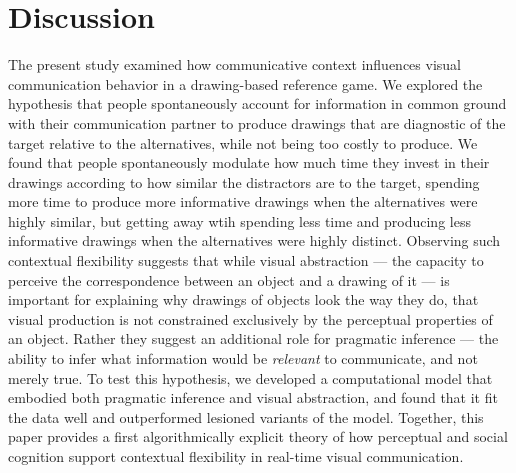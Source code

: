 \documentclass[9pt,twocolumn,twoside]{pnas-new}
\begin{document}
\section*{Discussion}

The present study examined how communicative context influences visual communication behavior in a drawing-based reference game. 
We explored the hypothesis that people spontaneously account for information in common ground with their communication partner to produce drawings that are diagnostic of the target relative to the alternatives, while not being too costly to produce. 
We found that people spontaneously modulate how much time they invest in their drawings according to how similar the distractors are to the target, spending more time to produce more informative drawings when the alternatives were highly similar, but getting away wtih spending less time and producing less informative drawings when the alternatives were highly distinct.
Observing such contextual flexibility suggests that while visual abstraction --- the capacity to perceive the correspondence between an object and a drawing of it --- is important for explaining why drawings of objects look the way they do, that visual production is not constrained exclusively by the perceptual properties of an object.  
Rather they suggest an additional role for pragmatic inference --- the ability to infer what information would be \textit{relevant} to communicate, and not merely true.
To test this hypothesis, we developed a computational model that embodied both pragmatic inference and visual abstraction, and found that it fit the data well and outperformed lesioned variants of the model. 
Together, this paper provides a first algorithmically explicit theory of how perceptual and social cognition support contextual flexibility in real-time visual communication.
\end{document}
